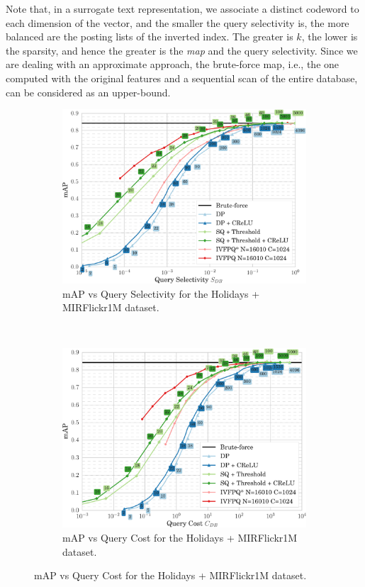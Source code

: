 Note that, in a surrogate text representation, we associate a distinct codeword to each dimension of the vector, and the smaller the query selectivity is, the more balanced are the posting lists of the inverted index.
The greater is $k$, the lower is the sparsity, and hence the greater is the \emph{\gls{map}} and the query selectivity.
Since we are dealing with an approximate approach, the brute-force \gls{map}, i.e., the one computed with the original features and a sequential scan of the entire database, can be considered as an upper-bound.

\begin{figure}

\begin{subfigure}{\linewidth}
\centering
\caption{\centering mAP vs Query Selectivity for the Holidays + MIRFlickr1M dataset.}%
\includegraphics[width=\linewidth,height=0.44\textheight,keepaspectratio]{plot_Holidays_MIRFlickr1M_QSelectivity}
\end{subfigure}\\[4ex]
\begin{subfigure}{\linewidth}
\centering
\caption{\centering mAP vs Query Cost for the Holidays + MIRFlickr1M dataset.}%
\includegraphics[width=\linewidth,height=0.44\textheight,keepaspectratio]{plot_Holidays_MIRFlickr1M_QCost}
\end{subfigure}
\end{figure}%
